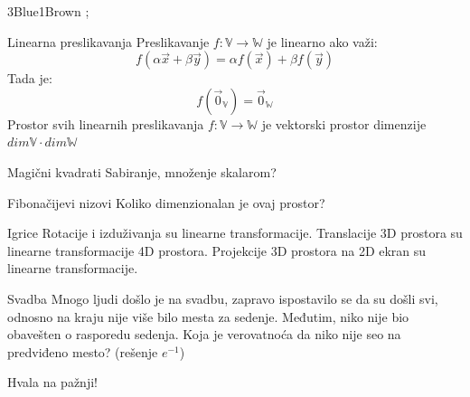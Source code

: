 \documentclass{beamer}
\begin{document}
    \begin{frame}{3Blue1Brown}
         ;
    \end{frame}
    \begin{frame}{Linearna preslikavanja}
        Preslikavanje $f : \mathbb V \to \mathbb W$ je linearno ako važi:
        $$f(\alpha \vec x + \beta \vec y) = \alpha f(\vec x) + \beta f(\vec y)$$
        Tada je:
        $$f(\vec 0_{\mathbb V}) = \vec 0_{\mathbb W}$$
        Prostor svih linearnih preslikavanja $f : \mathbb V \to \mathbb W$ je vektorski
        prostor dimenzije $dim \mathbb V \cdot dim \mathbb W$
    \end{frame}
    \begin{frame}{Magični kvadrati}
        Sabiranje, množenje skalarom?
    \end{frame}
    \begin{frame}{Fibonačijevi nizovi}
        Koliko dimenzionalan je ovaj prostor?
    \end{frame}
    \begin{frame}{Igrice}
        Rotacije i izduživanja su linearne transformacije.
        Translacije 3D prostora su linearne transformacije 4D prostora.
        Projekcije 3D prostora na 2D ekran su linearne transformacije.
    \end{frame}
    \begin{frame}{Svadba}
        Mnogo ljudi došlo je na svadbu, zapravo ispostavilo se da su došli svi,
        odnosno na kraju nije više bilo mesta za sedenje. Međutim, niko nije bio obavešten o
        rasporedu sedenja. Koja je verovatnoća da niko nije seo na predviđeno mesto?
        (rešenje $e^{-1}$)
    \end{frame}
    \begin{frame}
        Hvala na pažnji!
    \end{frame}
\end{document}
